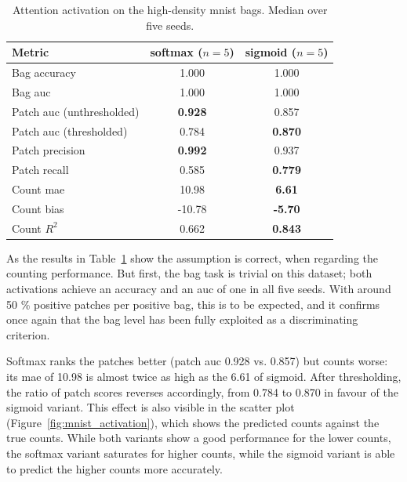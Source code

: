 \documentclass[12pt,parskip = half, DIV=classic,listof=totoc]{scrartcl}
\begin{document}
			\begin{table}[htbp]
				\centering
				\small
				\begin{tabular}{lcc}
					\toprule
					Metric & softmax ($n=5$) & sigmoid ($n=5$) \\
					\midrule
					Bag accuracy & 1.000 & 1.000 \\
					Bag \acs*{auc} & 1.000 & 1.000 \\
					Patch \acs*{auc} (unthresholded) & \textbf{0.928} & 0.857 \\
					Patch \acs*{auc} (thresholded) & 0.784 & \textbf{0.870} \\
					Patch precision & \textbf{0.992} & 0.937 \\
					Patch recall & 0.585 & \textbf{0.779} \\
					Count \acs*{mae} & 10.98 & \textbf{6.61} \\
					Count bias & -10.78 & \textbf{-5.70} \\
					Count $R^2$ & 0.662 & \textbf{0.843} \\
					\bottomrule
				\end{tabular}
				\caption[Attention activation on the high-density \acs*{mnist} bags]{Attention activation on the high-density \ac{mnist} bags. Median over five seeds.}
				\label{tab:mnist_activation}
			\end{table}
			As the results in Table~\ref{tab:mnist_activation} show the assumption is correct, when regarding the counting performance.
			But first, the bag task is trivial on this dataset; both activations achieve an accuracy and an \ac{auc} of one in all five seeds.
			With around 50 \% positive patches per positive bag, this is to be expected, and it confirms once again that the bag level has been
			fully exploited as a discriminating criterion.

			Softmax ranks the patches better (patch \ac{auc} 0.928 vs. 0.857) but counts worse: its \ac{mae} of 10.98 is almost twice as high 
			as the 6.61 of sigmoid. After thresholding, the ratio of patch scores reverses accordingly, from 0.784 to 0.870
			in favour of the sigmoid variant. This effect is also visible in the scatter plot (Figure~\ref{fig:mnist_activation}), 
			which shows the predicted counts against the true counts. While both variants show a good performance for the lower counts, 
			the softmax variant saturates for higher counts, while the sigmoid variant is able to predict the higher counts more accurately. 
\end{document}
